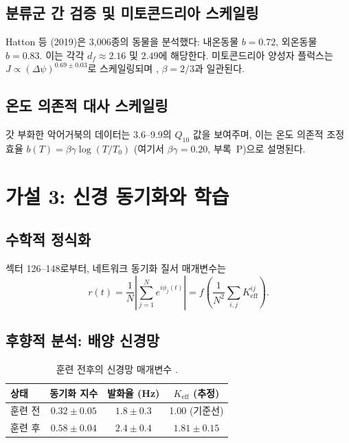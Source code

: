 \documentclass[11pt,a4paper]{article}
\begin{document}
	\subsection{분류군 간 검증 및 미토콘드리아 스케일링}
	
	Hatton 등 (2019)은 3,006종의 동물을 분석했다: 내온동물 \(b=0.72\), 외온동물 \(b=0.83\). 이는 각각 \(d_f \approx 2.16\) 및 \(2.49\)에 해당한다. 미토콘드리아 양성자 플럭스는 \(J \propto (\Delta \psi)^{0.69 \pm 0.03}\)로 스케일링되며 \cite{West2023}, \(\beta=2/3\)과 일관된다.
	
	\subsection{온도 의존적 대사 스케일링}
	
	갓 부화한 악어거북의 데이터는 3.6--9.9의 \(Q_{10}\) 값을 보여주며, 이는 온도 의존적 조정 효율 \(b(T) = \beta\gamma \log(T/T_0)\) (여기서 \(\beta\gamma = 0.20\), 부록~P)으로 설명된다.
	
	\section{가설 3: 신경 동기화와 학습}
	
	\subsection{수학적 정식화}
	
	섹터 126--148로부터, 네트워크 동기화 질서 매개변수는
	\begin{equation}
		r(t) = \frac{1}{N}\left|\sum_{j=1}^N e^{i\phi_j(t)}\right| = f\left(\frac{1}{N^2}\sum_{i,j} K_{\text{eff}}^{ij}\right).
		\label{eq:sync_order}
	\end{equation}
	
	\subsection{후향적 분석: 배양 신경망}
	
	\begin{table}[H]
		\centering
		\caption{훈련 전후의 신경망 매개변수 \cite{PLOS2025b}.}
		\label{tab:neural-training}
		\begin{tabular}{lccc}
			\toprule
			\textbf{상태} & \textbf{동기화 지수} & \textbf{발화율 (Hz)} & \(K_{\text{eff}}\) (추정) \\
			\midrule
			훈련 전 & \(0.32 \pm 0.05\) & \(1.8 \pm 0.3\) & 1.00 (기준선) \\
			훈련 후 & \(0.58 \pm 0.04\) & \(2.4 \pm 0.4\) & \(1.81 \pm 0.15\) \\
			\bottomrule
		\end{tabular}
	\end{table}
	
\end{document}
